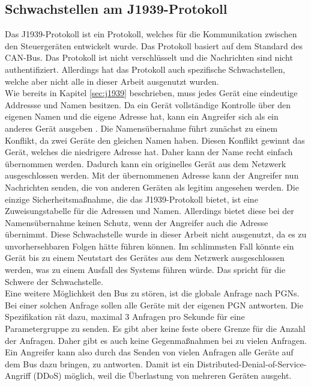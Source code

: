 \subsection{Schwachstellen am J1939-Protokoll}
Das J1939-Protokoll ist ein Protokoll, welches für die Kommunikation zwischen den Steuergeräten
entwickelt wurde. Das Protokoll basiert auf dem Standard des CAN-Bus. Das Protokoll ist nicht verschlüsselt und die Nachrichten
sind nicht authentifiziert. 
Allerdings hat das Protokoll auch spezifische Schwachstellen, welche aber nicht alle in dieser Arbeit ausgenutzt wurden.\\
Wie bereits in Kapitel \ref{sec:j1939} beschrieben, muss jedes Gerät eine eindeutige Addressse und Namen besitzen.
Da ein Gerät vollständige Kontrolle über 
den eigenen Namen und die eigene Adresse hat, kann ein Angreifer sich als ein anderes Gerät ausgeben \cite{Murvay2018}. 
Die Namensübernahme führt
zunächst zu einem Konflikt, da zwei Geräte den gleichen Namen haben. Diesen Konflikt gewinnt das Gerät, welches die niedrigere
Adresse hat. Daher kann der Name recht einfach übernommen werden. Dadurch kann ein originelles Gerät aus dem Netzwerk ausgeschlossen
werden. Mit der übernommenen Adresse kann der Angreifer nun Nachrichten senden, die von anderen Geräten als legitim angesehen werden.
Die einzige Sicherheitsmaßnahme, die das J1939-Protokoll bietet, ist eine Zuweisungstabelle für die Adressen und Namen. Allerdings
bietet diese bei der Namensübernahme keinen Schutz, wenn der Angreifer auch die Adresse übernimmt. Diese Schwachstelle 
wurde in dieser Arbeit nicht ausgenutzt, da es zu unvorhersehbaren Folgen hätte führen können. 
Im schlimmsten Fall könnte ein Gerät bis zu einem Neutstart des Gerätes aus dem Netzwerk ausgeschlossen werden, 
was zu einem Ausfall des Systems führen würde.
Das spricht für die Schwere der Schwachstelle.\\
Eine weitere Möglichkeit den Bus zu stören, ist die globale Anfrage nach PGNs. Bei einer solchen Anfrage sollen alle Geräte
mit der eigenen PGN antworten. Die Spezifikation rät dazu, maximal 3 Anfragen pro Sekunde für eine Parametergruppe zu senden.
Es gibt aber keine feste obere Grenze für die Anzahl der Anfragen. Daher gibt es auch keine Gegenmaßnahmen bei zu vielen 
Anfragen. Ein Angreifer kann also durch das Senden von vielen Anfragen alle Geräte auf dem Bus dazu bringen, zu antworten.
Damit ist ein Distributed-Denial-of-Service-Angriff (DDoS) möglich, weil die Überlastung von mehreren Geräten ausgeht. \\


